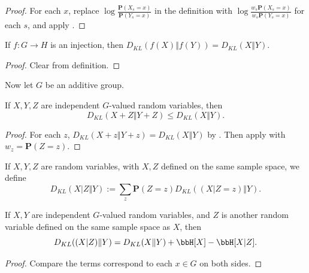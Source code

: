 \begin{proof}\leanok
For each $x$, replace $\log \frac{\mathbf{P}(X_s=x)}{\mathbf{P}(Y_s=x)}$ in the definition with $\log \frac{w_s\mathbf{P}(X_s=x)}{w_s\mathbf{P}(Y_s=x)}$ for each $s$, and apply .
\end{proof}


\begin{lemma}\label{kl-div-inj}\leanok  If $f:G \to H$ is an injection, then $D_{KL}(f(X)\Vert f(Y)) = D_{KL}(X\Vert Y)$.
\end{lemma}

\begin{proof}\leanok{} Clear from definition.
\end{proof}

Now let $G$ be an additive group.

\begin{lemma}\label{kl-sums}\leanok If $X, Y, Z$ are independent $G$-valued random variables, then
  $$D_{KL}(X+Z\Vert Y+Z) \leq D_{KL}(X\Vert Y).$$
\end{lemma}

\begin{proof}\leanok
For each $z$, $D_{KL}(X+z\Vert Y+z)=D_{KL}(X\Vert Y)$ by . Then apply  with $w_z=\mathbf{P}(Z=z)$.
\end{proof}

\begin{definition}\label{ckl-div}  \leanok
  If $X,Y,Z$ are random variables, with $X,Z$ defined on the same sample space, we define
$$ D_{KL}(X|Z \Vert  Y) := \sum_z \mathbf{P}(Z=z) D_{KL}( (X|Z=z) \Vert  Y).$$
\end{definition}

\begin{lemma}\label{kl-cond}\leanok If $X, Y$ are independent $G$-valued random variables, and $Z$ is another random variable defined on the same sample space as $X$, then
  $$D_{KL}((X|Z)\Vert Y) = D_{KL}(X\Vert Y) + \bbH[X] - \bbH[X|Z].$$
\end{lemma}

\begin{proof}\leanok
   Compare the terms correspond to each $x\in G$ on both sides.
\end{proof}

